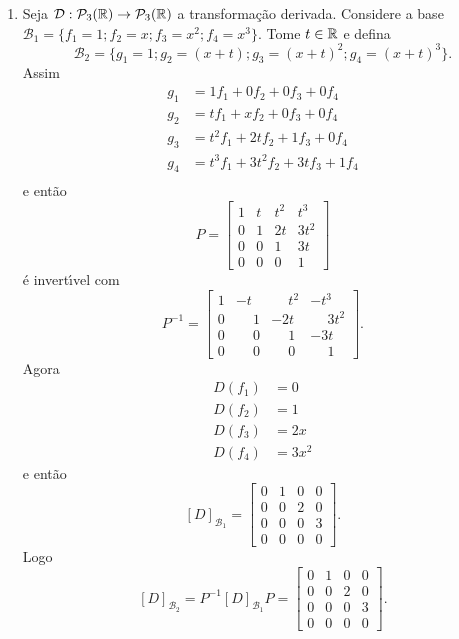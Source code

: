 \begin{exemplos}
\begin{enumerate}[label={\arabic*})]
		\item Seja $\mathcal{D} : \mathcal{P}_3(\mathbb{R}) \to \mathcal{P}_3(\mathbb{R})$ a transforma\c{c}\~ao derivada. Considere a base $\mathcal{B}_1 = \{f_1 = 1; f_2 = x; f_3 = x^2; f_4 = x^3\}$. Tome $t \in \mathbb{R}$ e defina
		\[
			\mathcal{B}_2 = \{g_1 = 1; g_2 = (x + t); g_3 = (x + t)^2; g_4 = (x + t)^3\}.
		\]
		Assim
		\begin{align*}
			g_1 &= 1f_1 + 0f_2 + 0f_3 + 0f_4\\
			g_2 &= tf_1 + xf_2 + 0f_3 + 0f_4\\
			g_3 &= t^2f_1 + 2tf_2 + 1f_3 + 0f_4\\
			g_4 &= t^3f_1 + 3t^2f_2 + 3tf_3 + 1f_4\\
		\end{align*}
		e ent\~ao
		\[
			P = \begin{bmatrix}
				1 & t & t^2 & t^3\\
				0 & 1 & 2t & 3t^2\\
				0 & 0 & 1 & 3t\\
				0 & 0 & 0 & 1
			\end{bmatrix}
		\]
		\'e invert{\'\i}vel com
		\[
			P^{-1} = \begin{bmatrix}
				1 & -t & \phantom{-}t^2 & -t^3\\
				0 & \phantom{-}1 & -2t & \phantom{-}3t^2\\
				0 & \phantom{-}0 & \phantom{-}1 & -3t\\
				0 & \phantom{-}0 & \phantom{-}0 & \phantom{-}1
			\end{bmatrix}.
		\]
		Agora
		\begin{align*}
			D(f_1) &= 0\\
			D(f_2) &= 1\\
			D(f_3) &= 2x\\
			D(f_4) &= 3x^2
		\end{align*}
		e ent\~ao
		\[
			[D]_{\mathcal{B}_1} = \begin{bmatrix}
				0 & 1 & 0 & 0\\
				0 & 0 & 2 & 0\\
				0 & 0 & 0 & 3\\
				0 & 0 & 0 & 0
			\end{bmatrix}.
		\]
		Logo
		\[
			[D]_{\mathcal{B}_2} = P^{-1}[D]_{\mathcal{B}_1}P = \begin{bmatrix}
				0 & 1 & 0 & 0\\
				0 & 0 & 2 & 0\\
				0 & 0 & 0 & 3\\
				0 & 0 & 0 & 0
			\end{bmatrix}.
		\]
	\end{enumerate}
\end{exemplos}
